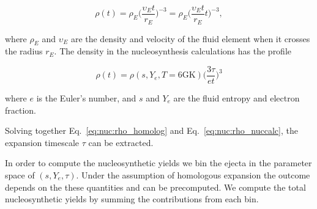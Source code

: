 \begin{equation}
\rho(t) = \rho_E\Big(\frac{\upsilon_E t}{r_E}\Big)^{-3} = 
\rho_E\Big(\frac{\upsilon_E t}{r_E}t\Big)^{-3},
\label{eq:nuc:rho_homolog}
\end{equation}

where $\rho_E$ and $\upsilon_E$ are the density and velocity of the fluid element 
when it crosses the radius $r_E$. 
The density in the nucleosynthesis calculations has the profile \citep{Lippuner:2015gwa} 

\begin{equation}
\rho(t) = \rho(s, Y_e, T=6\text{GK})\Big(\frac{3\tau}{e t}\Big)^3
\label{eq:nuc:rho_nuccalc}
\end{equation}

where $e$ is the Euler's number, and $s$ and $Y_e$ are the fluid entropy and 
electron fraction.

Solving together Eq.~\eqref{eq:nuc:rho_homolog} and Eq.~\eqref{eq:nuc:rho_nuccalc},
the expansion timescale $\tau$ can be extracted.

In order to compute the nucleosynthetic yields we bin the ejecta in the 
parameter space of $(s, Y_e, \tau)$. 
Under the assumption of homologous expansion the \rproc{} outcome depends on 
the these quantities and can be precomputed.
We compute the total nucleosynthetic yields by summing the contributions from 
each bin.


